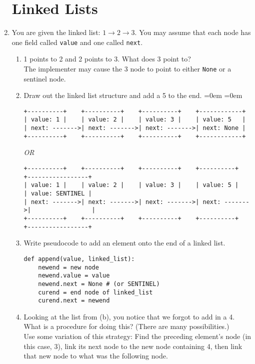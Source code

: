 \documentclass[11pt]{article}
\newenvironment{answer}{\large\lstset{basicstyle=\tiny\ttfamily}\color{white}}{}
\newenvironment{answer}{\large\lstset{basicstyle=\large\ttfamily}\color{red}}{}
\begin{document}
\begin{enumerate}
\section*{Linked Lists}
    \item You are given the linked list: $1 \rightarrow 2 \rightarrow 3$.  You may assume that each node has one field called \texttt{value} and one called \texttt{next}.
        \begin{enumerate}
            \item 1 points to 2 and 2 points to 3. What does 3 point to? \\
                \begin{answer}
				The implementer may cause the 3 node to point to either \texttt{None} or a sentinel node.
				\end{answer}
            \item Draw out the linked list structure and add a 5 to the end.
				\begin{answer}
				\leftmargin=0em
				\itemindent=0em
				{ \small
				\begin{verbatim}
+----------+    +----------+    +----------+    +------------+
| value: 1 |    | value: 2 |    | value: 3 |    | value: 5   |
| next: ------->| next: ------->| next: ------->| next: None |
+----------+    +----------+    +----------+    +------------+
				\end{verbatim}
				\textit{OR}
				\begin{verbatim}
+----------+    +----------+    +----------+    +----------+    +-----------------+
| value: 1 |    | value: 2 |    | value: 3 |    | value: 5 |    | value: SENTINEL |
| next: ------->| next: ------->| next: ------->| next: ------->|                 |
+----------+    +----------+    +----------+    +----------+    +-----------------+
				\end{verbatim} }
				\end{answer}
            \item Write pseudocode to add an element onto the end of a linked list.
				\begin{answer}
				\begin{lstlisting}
def append(value, linked_list):
	newend = new node
	newend.value = value
	newend.next = None # (or SENTINEL)
	curend = end node of linked_list
	curend.next = newend
				\end{lstlisting}
				\end{answer}
				\vspace{1in}
            \item Looking at the list from (b), you notice that we forgot to
                  add in a 4. What is a procedure for doing this? (There are
                  many possibilities.) \\
                \begin{answer}
				Use some variation of this strategy: Find the preceding element's node (in this case, 3), link its next node to the new node containing 4, then link that new node to what was the following node.
				\end{answer}
				\vspace{1in}
        \end{enumerate}


\end{enumerate}
\end{document}
